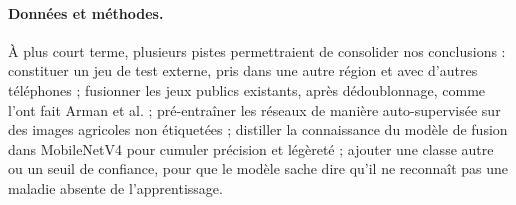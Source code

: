 \paragraph{Données et méthodes.} À plus court terme, plusieurs pistes permettraient de consolider nos conclusions : constituer un jeu de test externe, pris dans une autre région et avec d'autres téléphones ; fusionner les jeux publics existants, après dédoublonnage, comme l'ont fait Arman et al. \cite{arman2025sugarcaneshufflenet} ; pré-entraîner les réseaux de manière auto-supervisée sur des images agricoles non étiquetées ; distiller la connaissance du modèle de fusion dans MobileNetV4 pour cumuler précision et légèreté ; ajouter une classe \og autre \fg{} ou un seuil de confiance, pour que le modèle sache dire qu'il ne reconnaît pas une maladie absente de l'apprentissage.

